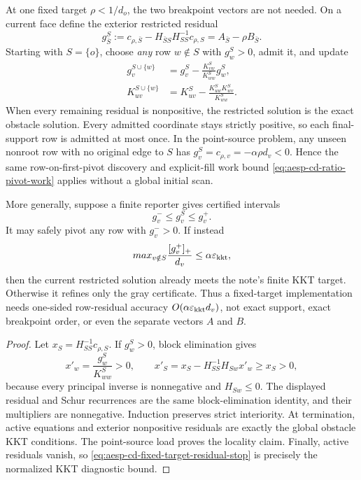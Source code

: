 \begin{corollary}
\label{cor:aesp-cd-point-source-fixed-target-pivot}
At one fixed target \(\rho<1/d_o\), the two breakpoint vectors are not
needed.  On a current face define the exterior restricted residual
\begin{equation*}
 g^S_{\bar S}
 :=c_{\rho,\bar S}-H_{\bar SS}H_{SS}^{-1}c_{\rho,S}
 =A_{\bar S}-\rho B_{\bar S}.
\end{equation*}
Starting with \(S=\{o\}\), choose \emph{any} row \(w\notin S\) with
\(g^S_w>0\), admit it, and update
\begin{align*}
 g^{S\cup\{w\}}_v
 &=g^S_v-\frac{K^S_{vw}}{K^S_{ww}}g^S_w,\\
 K^{S\cup\{w\}}_{uv}
 &=K^S_{uv}-\frac{K^S_{uw}K^S_{wv}}{K^S_{ww}}.
\end{align*}
When every remaining residual is nonpositive, the restricted solution is the
exact obstacle solution.  Every admitted coordinate stays strictly positive,
so each final-support row is admitted at most once.  In the point-source
problem, any unseen nonroot row with no original edge to \(S\) has
\(g^S_v=c_{\rho,v}=-\alpha\rho d_v<0\).  Hence the same row-on-first-pivot
discovery and explicit-fill work bound
\cref{eq:aesp-cd-ratio-pivot-work} applies without a global initial scan.

More generally, suppose a finite reporter gives certified intervals
\begin{equation*}
 g_v^-\leq g^S_v\leq g_v^+.
\end{equation*}
It may safely pivot any row with \(g_v^->0\).  If instead
\begin{equation}
 max_{v\notin S}\frac{[g_v^+]_+}{d_v}
 \leq\alpha\varepsilon_{\mathrm{kkt}},
 \label{eq:aesp-cd-fixed-target-residual-stop}
\end{equation}
then the current restricted solution already meets the note's finite KKT
target.  Otherwise it refines only the gray certificate.  Thus a fixed-target
implementation needs one-sided row-residual accuracy
\(O(\alpha\varepsilon_{\mathrm{kkt}} d_v)\), not exact support, exact breakpoint order, or even
the separate vectors \(A\) and \(B\).
\end{corollary}

\begin{proof}
Let \(x_S=H_{SS}^{-1}c_{\rho,S}\).  If \(g^S_w>0\), block elimination gives
\begin{equation*}
 x'_w=\frac{g^S_w}{K^S_{ww}}>0,
 \qquad
 x'_S=x_S-H_{SS}^{-1}H_{Sw}x'_w\geq x_S>0,
\end{equation*}
because every principal inverse is nonnegative and \(H_{Sw}\leq0\).  The
displayed residual and Schur recurrences are the same block-elimination
identity, and their multipliers are nonnegative.  Induction preserves strict
interiority.  At termination, active equations and exterior nonpositive
residuals are exactly the global obstacle KKT conditions.  The point-source
load proves the locality claim.  Finally, active residuals vanish, so
\cref{eq:aesp-cd-fixed-target-residual-stop} is precisely the normalized KKT
diagnostic bound.
\end{proof}

